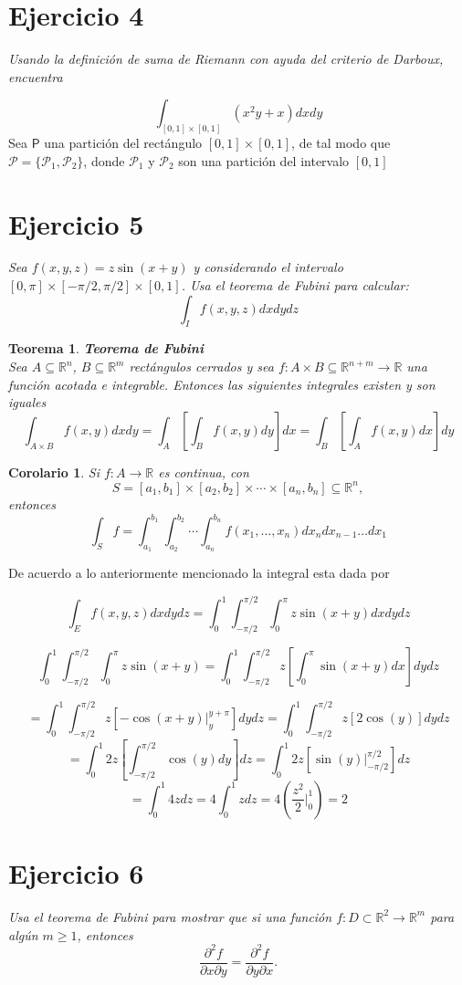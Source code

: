 \documentclass[a4paper,12pt]{article}
\newtheorem{teoremas}{Teorema}[subsection]
\newtheorem{Corolario}{Corolario}[subsection]
\begin{document}
\section{Ejercicio 4}
\textit{Usando la definición de suma de Riemann con ayuda del criterio de Darboux, encuentra}


\[\int_{[0,1] \times [0,1]} (x^2y+x)dxdy\]
Sea $\mathsf{P}$ una partición del rectángulo $[0,1] \times [0,1]$, de tal modo que
$\mathcal{P} = \lbrace \mathcal{P}_1, \mathcal{P}_2 \rbrace$, donde $\mathcal{P}_1$ y $\mathcal{P}_2$ son una partición
del intervalo $[0,1]$

\newpage
\section{Ejercicio 5}
\textit{Sea $f(x,y,z) = z \sin(x+y)$ y considerando el intervalo $[0,\pi]\times[-\pi/2,\pi/2]\times[0,1]$. Usa el teorema
de Fubini para calcular:}
\[\int_{I} f(x,y,z) dxdydz\]


\begin{teoremas} {\textbf{Teorema de Fubini}}\\
    Sea $A\subseteq \mathbb{R}^n$, $B\subseteq \mathbb{R}^m$ rectángulos cerrados y sea $f : A\times B\subseteq \mathbb{R}^{n+m} \rightarrow \mathbb{R}$
    una función acotada e integrable. Entonces las siguientes integrales existen y son iguales
    \[\int_{A\times B} f(x,y)dxdy = \int_{A}\left[ \int_{B} f(x,y)dy\right]dx = \int_{B}\left[ \int_{A} f(x,y)dx\right]dy\]

\end{teoremas}


\begin{Corolario}
    Si $f : A \rightarrow \mathbb{R}$ es continua, con
    \[S = [a_1,b_1] \times [a_2,b_2] \times \cdots \times [a_n,b_n]   \subseteq \mathbb{R}^n,\]
    entonces
    \[\int_{S} f = \int_{a_1}^{b_1} \int_{a_2}^{b_2} \cdots \int_{a_n}^{b_n} f(x_1,\ldots,x_n) dx_{n}dx_{n-1}\ldots dx_1\]
\end{Corolario}


De acuerdo a lo anteriormente mencionado la integral esta dada por

\[\int_{E} f(x,y,z)dxdydz = \int_{0}^{1} \int_{-\pi/2}^{\pi/2} \int_{0}^{\pi} z\sin (x+y) dxdydz\]

\[\int_{0}^{1} \int_{-\pi/2}^{\pi/2} \int_{0}^{\pi} z\sin (x+y) = \int_{0}^{1} \int_{-\pi/2}^{\pi/2} z \left[ \int_{0}^{\pi} \sin (x+y) dx \right] dydz \]

\[ = \int_{0}^{1} \int_{-\pi/2}^{\pi/2} z \left[ -\cos (x+y) \vert_{y}^{y + \pi} \right] dydz = \int_{0}^{1} \int_{-\pi/2}^{\pi/2} z \left[ 2\cos (y)\right] dydz\]
\[ = \int_{0}^{1} 2z\left[\int_{-\pi/2}^{\pi/2}  \cos (y) dy\right] dz =  \int_{0}^{1} 2z\left[\sin(y) \vert_{-\pi/2}^{\pi/2}\right] dz\]
\[ = \int_{0}^{1} 4z dz = 4 \int_{0}^{1} z dz = 4 (\frac{z^2}{2}\vert_{0}^1) = 2 \]

\newpage
\section{Ejercicio 6}
\textit{Usa el teorema de Fubini para mostrar que si una función $f : D \subset \mathbb{R}^2 \rightarrow \mathbb{R}^m$
para algún $m \geq 1$, entonces}
\[\frac{\partial^2 f}{\partial x \partial y} = \frac{\partial^2 f}{\partial y \partial x}.\]
\end{document}
